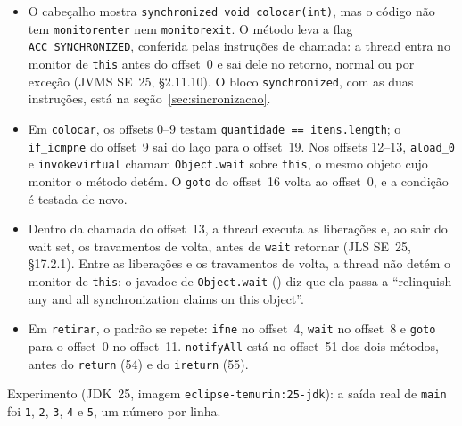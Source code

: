 \begin{itemize}
\item O cabeçalho mostra \texttt{synchronized void colocar(int)}, mas o
  código não tem \texttt{monitorenter} nem \texttt{monitorexit}. O
  método leva a flag \texttt{ACC\_SYNCHRONIZED}, conferida pelas
  instruções de chamada: a thread entra no monitor de \texttt{this} antes
  do offset~0 e sai dele no retorno, normal ou por exceção (JVMS SE~25,
  §2.11.10). O bloco \texttt{synchronized}, com as duas instruções, está
  na seção~\ref{sec:sincronizacao}.
\item Em \texttt{colocar}, os offsets 0--9 testam
  \texttt{quantidade == itens.length}; o \texttt{if\_icmpne} do
  offset~9 sai do laço para o offset~19. Nos offsets 12--13,
  \texttt{aload\_0} e \texttt{invokevirtual} chamam
  \texttt{Object.wait} sobre \texttt{this}, o mesmo objeto cujo monitor
  o método detém. O \texttt{goto} do offset~16 volta ao offset~0, e a
  condição é testada de novo.
\item Dentro da chamada do offset~13, a thread executa as liberações
  e, ao sair do wait set, os travamentos de volta, antes de
  \texttt{wait} retornar (JLS SE~25, §17.2.1). Entre as liberações e
  os travamentos de volta, a thread não detém o monitor de
  \texttt{this}: o javadoc de \texttt{Object.wait}
  () diz que ela passa a
  \enquote{relinquish any and all synchronization claims on this
  object}.
\item Em \texttt{retirar}, o padrão se repete: \texttt{ifne} no
  offset~4, \texttt{wait} no offset~8 e \texttt{goto} para o offset~0
  no offset~11. \texttt{notifyAll} está no offset~51 dos dois métodos,
  antes do \texttt{return} (54) e do \texttt{ireturn} (55).
\end{itemize}

Experimento (JDK~25, imagem \texttt{eclipse-temurin:25-jdk}): a saída
real de \texttt{main} foi \texttt{1}, \texttt{2}, \texttt{3},
\texttt{4} e \texttt{5}, um número por linha.

